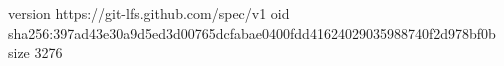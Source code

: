 version https://git-lfs.github.com/spec/v1
oid sha256:397ad43e30a9d5ed3d00765dcfabae0400fdd41624029035988740f2d978bf0b
size 3276

